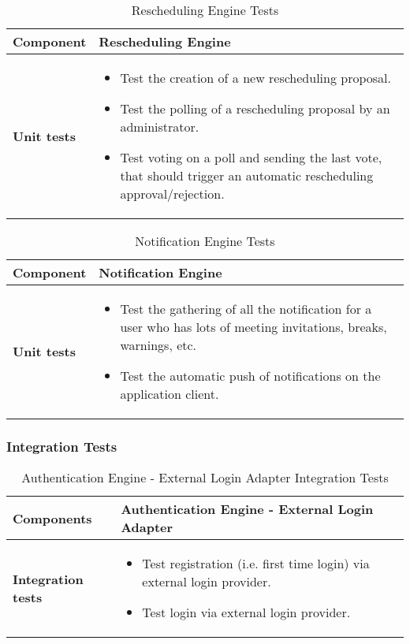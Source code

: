 \begin{table}[H]	
	\centering
	\def\arraystretch{1.5}
	\begin{tabular}{|m{4cm}|m{12cm}|}
		\hline
		\textbf{Component} & Rescheduling Engine \\ \hline
		\textbf{Unit tests} & 
			\begin{itemize}
			\item Test the creation of a new rescheduling proposal.
			\item Test the polling of a rescheduling proposal by an administrator.
			\item Test voting on a poll and sending the last vote, that should trigger an automatic rescheduling approval/rejection.
			\end{itemize} \\ \hline
	\end{tabular}
	\caption{Rescheduling Engine Tests}
\end{table}

\begin{table}[H]	
	\centering
	\def\arraystretch{1.5}
	\begin{tabular}{|m{4cm}|m{12cm}|}
		\hline
		\textbf{Component} & Notification Engine \\ \hline
		\textbf{Unit tests} & 
			\begin{itemize}
			\item Test the gathering of all the notification for a user who has lots of meeting invitations, breaks, warnings, etc.
			\item Test the automatic push of notifications on the application client.
			\end{itemize} \\ \hline
	\end{tabular}
	\caption{Notification Engine Tests}
\end{table}

\subsubsection{Integration Tests}

\begin{table}[H]	
	\centering
	\def\arraystretch{1.5}
	\begin{tabular}{|m{4cm}|m{12cm}|}
		\hline
		\textbf{Components} & Authentication Engine - External Login Adapter \\ \hline
		\textbf{Integration tests} &
			\begin{itemize} 
			\item Test registration (i.e. first time login) via external login provider.
			\item Test login via external login provider. 
			\end{itemize} \\ \hline
	\end{tabular}
	\caption{Authentication Engine - External Login Adapter Integration Tests}
\end{table}

